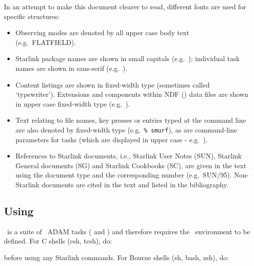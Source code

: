\documentclass[oneside,11pt]{starlink}
\begin{document}
In an attempt to make this document clearer to read, different fonts
are used for specific structures:
\begin{itemize}

\item Observing modes are denoted by all upper case body text (e.g.\
FLATFIELD).

\item Starlink package names are shown in small capitals (e.g.\ \SMURF);
individual task names are shown in sans-serif (e.g.\ \makemap).

\item Content listings are shown in fixed-width type (sometimes called
`typewriter'). Extensions and components within NDF (\ndf) data
files are shown in upper case fixed-width type (e.g.\
).

\item Text relating to file names, key presses or entries typed at the
command line are also denoted by fixed-width type (e.g.\ \texttt{\%
  smurf}), as are command-line parameters for tasks (which are displayed in
upper case - e.g.\ \aparam{METHOD}).

\item References to Starlink documents, i.e., Starlink User Notes (SUN),
Starlink General documents (SG) and Starlink Cookbooks (SC), are given
in the text using the document type and the corresponding number
(e.g.\ SUN/95). Non-Starlink documents are cited in the text and
listed in the bibliography.

\end{itemize}


\subsection{Using \SMURF}

\SMURF\ is a suite of \starlink\ ADAM tasks (
and ) and therefore requires the \starlink\
environment to be defined. For C shells (csh, tcsh), do:

\begin{terminalv}
\end{terminalv}

before using any Starlink commands. For Bourne shells (sh, bash, zsh), do:

\begin{terminalv}
\end{terminalv}
\end{document}
